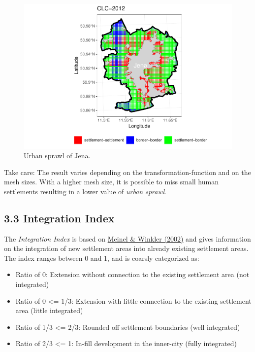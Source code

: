 \documentclass[]{article}
\providecommand{\tightlist}{%
  \setlength{\itemsep}{0pt}\setlength{\parskip}{0pt}}
\begin{document}
\begin{figure}[!h]

{\centering \includegraphics{vignette_files/figure-latex/unnamed-chunk-9-1} 

}

\caption{Urban sprawl of Jena.}\label{fig:unnamed-chunk-9}
\end{figure}

Take care: The result varies depending on the transformation-function
and on the mesh sizes. With a higher mesh size, it is possible to miss
small human settlements resulting in a lower value of \emph{urban
sprawl}.

\subsection{3.3 Integration Index}\label{integration-index}

The \emph{Integration Index} is based on
\href{https://www2.ioer.de/recherche/pdf/2002_meinel_earsel.pdf}{Meinel
\& Winkler (2002)} and gives information on the integration of new
settlement areas into already existing settlement areas. The index
ranges between 0 and 1, and is coarsly categorized as:

\begin{itemize}
\tightlist
\item
  Ratio of 0: Extension without connection to the existing settlement
  area (not integrated)
\item
  Ratio of 0 \textless{}= 1/3: Extension with little connection to the
  existing settlement area (little integrated)
\item
  Ratio of 1/3 \textless{}= 2/3: Rounded off settlement boundaries (well
  integrated)
\item
  Ratio of 2/3 \textless{}= 1: In-fill development in the inner-city
  (fully integrated)
\end{itemize}
\end{document}
